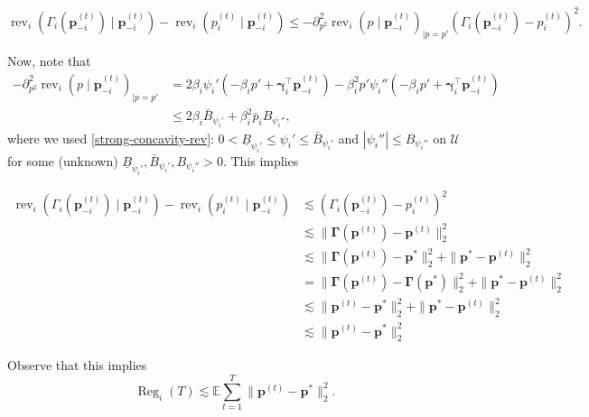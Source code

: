 \documentclass{article} %
\begin{document}
$$
\operatorname{rev}_i(\Gamma_i(\mathbf{p}^{(t)}_{-i}) \mid \mathbf{p}_{-i}^{(t)}) -  \operatorname{rev}_i(p^{(t)}_i \mid \mathbf{p}_{-i}^{(t)}) \leq -  \partial^2_{p^2}\operatorname{rev}_i(p \mid \mathbf{p}_{-i}^{(t)})_{|p=p'}(\Gamma_i(\mathbf{p}^{(t)}_{-i})-p_i^{(t)})^2 .
$$

Now, note that
\begin{align*}
-\partial^2_{p^2}\operatorname{rev}_i(p \mid \mathbf{p}_{-i}^{(t)})_{|p=p'} &= 2\beta_i\psi_i'(-\beta_ip'+\boldsymbol{\gamma}_i^{\top}\mathbf{p}_{-i}^{(t)}) -\beta_i^2p'\psi_i''(-\beta_ip'+\boldsymbol{\gamma}_i^{\top}\mathbf{p}_{-i}^{(t)}) \\
&\leq 2 \beta_i \bar{B}_{\psi_i'}+\beta_i^2\bar{p}_i B_{\psi_i''},
\end{align*}
where we used \cref{strong-concavity-rev}:  $0<\underline{B}_{\psi_i'} \leq \psi_i'\leq \bar{B}_{\psi_i'}$ and $|\psi_i''| \leq B_{\psi_i''}$ on $\mathcal{U}$ for some (unknown) $\underline{B}_{\psi_i'},\bar{B}_{\psi_i'},B_{\psi_i''}>0$. This implies 

\begin{align}\label{eq:rev_diff}
\operatorname{rev}_i(\Gamma_i(\mathbf{p}^{(t)}_{-i}) \mid \mathbf{p}_{-i}^{(t)}) -  \operatorname{rev}_i(p^{(t)}_i \mid \mathbf{p}_{-i}^{(t)}) &\lesssim (\Gamma_i(\mathbf{p}^{(t)}_{-i})-p_i^{(t)})^2\nonumber\\
&\lesssim \|\boldsymbol{\Gamma}(\mathbf{p}^{(t)})-\mathbf{p}^{(t)}\|_2^2\nonumber\\
&\lesssim \|\boldsymbol{\Gamma}(\mathbf{p}^{(t)})-\mathbf{p}^{*}\|_2^2 +\|\mathbf{p}^{*}-\mathbf{p}^{(t)}\|_2^2\nonumber\\
&= \|\boldsymbol{\Gamma}(\mathbf{p}^{(t)})-\boldsymbol{\Gamma}(\mathbf{p}^{*})\|_2^2 +\|\mathbf{p}^{*}-\mathbf{p}^{(t)}\|_2^2\nonumber\\
&\lesssim \|\mathbf{p}^{(t)}-\mathbf{p}^{*}\|_2^2 +\|\mathbf{p}^{*}-\mathbf{p}^{(t)}\|_2^2\nonumber\\
&\lesssim \|\mathbf{p}^{(t)}-\mathbf{p}^{*}\|_2^2
\end{align}

Observe that this implies 
\begin{equation}\label{ineq:reg_NE_conv_rate}
\operatorname{Reg}_i(T)\lesssim \mathbb{E} \sum_{t=1}^T \|\mathbf{p}^{(t)}-\mathbf{p}^{*}\|_2^2.
\end{equation}
\end{document}
